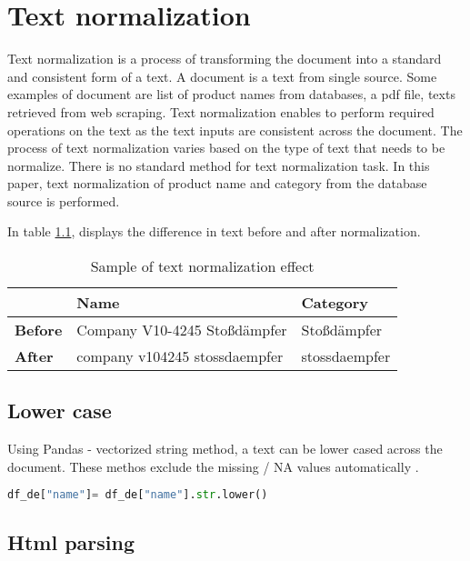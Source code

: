 \chapter{Text normalization} \label{text_normalization}

Text normalization is a process of transforming the document into a standard and consistent form of a text. A document is a text from single source. Some examples of document are list of product names from databases, a pdf file, texts retrieved from web scraping. Text normalization enables to perform required operations on the text as the text inputs are consistent across the document. The process of text normalization varies based on the type of text that needs to be normalize. There is no standard method for text normalization task. In this paper, text normalization of product name and category from the database source is performed. 

In table \ref{table:TN}, displays the difference in text before and after normalization. 

\begin{table}[h]
      \caption{Sample of text normalization effect}
      \centering
      \label{table:TN}
\begin{tabular}{lll}
      \toprule 
                  &\textbf{Name} & \textbf{Category} \\ 
      \midrule
      \textbf{Before}& Company V10-4245 Stoßdämpfer & Stoßdämpfer \\
      \textbf{After}&company v104245 stossdaempfer & stossdaempfer \\
      
      \bottomrule
\end{tabular}
\end{table}

\section{Lower case}

Using Pandas - vectorized string method, a text can be lower cased across the document. These methos exclude the missing  / NA values automatically \parencite{mckinney-proc-scipy-2010}.

\begin{lstlisting}[language=Python, caption={Pandas vectorized string method }]
      df_de["name"]= df_de["name"].str.lower()
\end{lstlisting}

\section{Html parsing}

